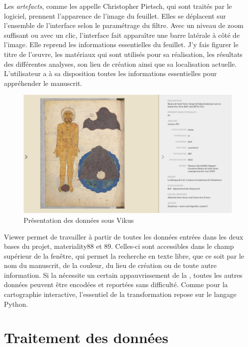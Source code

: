Les \textit{artefacts}, comme les appelle Christopher Pietsch, qui sont traités par le logiciel, prennent l’apparence de l’image du feuillet. Elles se déplacent sur l’ensemble de l’interface selon le paramétrage du filtre. Avec un niveau de zoom suffisant ou avec un clic, l’interface fait apparaître une barre latérale à côté de l’image. Elle reprend les informations essentielles du feuillet. J’y fais figurer le titre de l’œuvre, les matériaux qui sont utilisés pour sa réalisation, les résultats des différentes analyses, son lieu de création ainsi que sa localisation actuelle. L’utilisateur a à sa disposition toutes les informations essentielles pour appréhender le manuscrit.\par

\begin{figure}[H]
	\centering
	\includegraphics[width=\textwidth]{./textes/chap3/vikus-barre.jpg}
	\caption{Présentation des données sous Vikus}
	\label{fig:info}
\end{figure}

 Viewer permet de travailler à partir de toutes les données entrées dans les deux bases du projet, materiality88 et 89. Celles-ci sont accessibles dans le champ supérieur de la fenêtre, qui permet la recherche en texte libre, que ce soit par le nom du manuscrit, de la couleur, du lieu de création ou de toute autre information. Si la  nécessite un certain appauvrissement de la , toutes les autres données peuvent être encodées et reportées sans difficulté. Comme pour la cartographie interactive, l’essentiel de la transformation repose sur le langage Python.\newpage

\section{Traitement des données}

